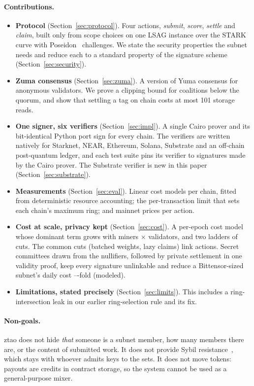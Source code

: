 \documentclass[11pt]{article}
\theoremstyle{remark}
\begin{document}
\paragraph{Contributions.}
\begin{itemize}
\item \textbf{Protocol} (Section~\ref{sec:protocol}). Four actions, \emph{submit}, \emph{score}, \emph{settle} and \emph{claim}, built only from scope choices on one LSAG instance over the STARK curve with Poseidon~\cite{poseidon} challenges. We state the security properties the subnet needs and reduce each to a standard property of the signature scheme (Section~\ref{sec:security}).
\item \textbf{Zuma consensus} (Section~\ref{sec:zuma}). A version of Yuma consensus for anonymous validators. We prove a clipping bound for coalitions below the quorum, and show that settling a tag on chain costs at most 101 storage reads.
\item \textbf{One signer, six verifiers} (Section~\ref{sec:impl}). A single Cairo prover and its bit-identical Python port sign for every chain. The verifiers are written natively for Starknet, NEAR, Ethereum, Solana, Substrate and an off-chain post-quantum ledger, and each test suite pins its verifier to signatures made by the Cairo prover. The Substrate verifier is new in this paper (Section~\ref{sec:substrate}).
\item \textbf{Measurements} (Section~\ref{sec:eval}). Linear cost models per chain, fitted from deterministic resource accounting; the per-transaction limit that sets each chain's maximum ring; and mainnet prices per action.
\item \textbf{Cost at scale, privacy kept} (Section~\ref{sec:cost}). A per-epoch cost model whose dominant term grows with miners $\times$ validators, and two ladders of cuts. The common cuts (batched weights, lazy claims) link actions. Secret committees drawn from the nullifiers, followed by private settlement in one validity proof, keep every signature unlinkable and reduce a Bittensor-sized subnet's daily cost \scaleMinRatio--\scaleMaxRatio-fold (modeled).
\item \textbf{Limitations, stated precisely} (Section~\ref{sec:limits}). This includes a ring-intersection leak in our earlier ring-selection rule and its fix.
\end{itemize}

\paragraph{Non-goals.} ztao does not hide \emph{that} someone is a subnet member, how many members there are, or the content of submitted work. It does not provide Sybil resistance~\cite{sybil}, which stays with whoever admits keys to the sets. It does not move tokens: payouts are credits in contract storage, so the system cannot be used as a general-purpose mixer.
\end{document}

